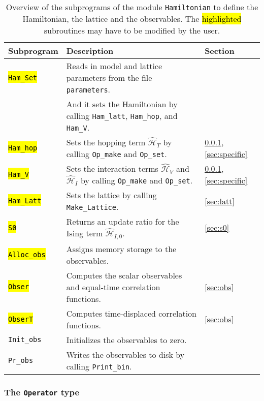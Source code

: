 %
\begin{table}[h]
    \begin{tabular}{@{} l l l @{}}\toprule
    Subprogram & Description & Section \\\midrule
    \hl{\texttt{Ham\_Set}}  & Reads in model and lattice parameters from the file \texttt{parameters}. \\
                       & And it sets the Hamiltonian by calling \texttt{Ham\_latt}, \texttt{Ham\_hop}, and \texttt{Ham\_V}. & \\
    \hl{\texttt{Ham\_hop}}  & Sets the hopping term  $\hat{\mathcal{H}}_{T}$ by calling \texttt{Op\_make} and \texttt{Op\_set}. & \ref{sec:op}, \ref{sec:specific}\\
    \hl{\texttt{Ham\_V}}    & Sets the interaction terms  $\hat{\mathcal{H}}_{V}$ and $\hat{\mathcal{H}}_{I}$ 
                         by calling \texttt{Op\_make} and \texttt{Op\_set}.& \ref{sec:op}, \ref{sec:specific}\\  
    \hl{\texttt{Ham\_Latt}} & Sets the lattice by calling \texttt{Make\_Lattice}.& \ref{sec:latt}\\
    \hl{\texttt{S0}}        & Returns an update ratio for the Ising term $\hat{\mathcal{H}}_{I,0}$. 
    & \ref{sec:s0} \\
    \hl{\texttt{Alloc\_obs}} & Assigns memory storage to the observables. & \\
    \hl{\texttt{Obser}}      & Computes the scalar observables and equal-time correlation functions. & \ref{sec:obs} \\
    \hl{\texttt{ObserT}}     & Computes time-displaced correlation functions. & \ref{sec:obs}\\
    \texttt{Init\_obs}  & Initializes the observables to zero. & \\    
    \texttt{Pr\_obs}    & Writes the observables to disk by calling \texttt{Print\_bin}. \\\bottomrule    
   \end{tabular}
   \caption{Overview of the subprograms of the  module \texttt{Hamiltonian} to define the Hamiltonian, the lattice and the observables. The \hl{highlighted} subroutines may have to be modified by the user.
    \label{table:hamiltonian}}
\end{table}
%

\subsubsection{The \texttt{Operator} type}\label{sec:op}

